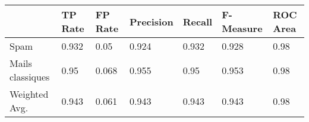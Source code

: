 \begin{tabular}{l|l|l|l|l|l|l}
                   & TP Rate   & FP Rate   & Precision    &Recall  & F-Measure   &ROC  Area   \\
\hline
Spam &  0.932 &    0.05 &      0.924 &    0.932 &    0.928 &     0.98     \\
\hline
Mails classiques &0.95 &     0.068 &     0.955 &    0.95 &     0.953 &     0.98    \\
\hline
Weighted Avg. &0.943 &    0.061 &     0.943 &    0.943 &    0.943 &     0.98  \\
\end{tabular}

